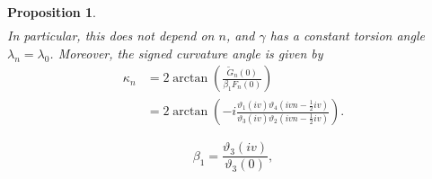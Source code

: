 \documentclass[10pt,a4paper]{amsart}
\newtheorem{prop}{Proposition}
\begin{document}
\begin{prop}
\begin{equation}
\begin{split}
\end{split}
\end{equation}
In particular, this does not depend on $n$,
and $\gamma$ has a constant torsion angle
$\lambda_n=\lambda_0$.
Moreover,
the signed curvature angle is given by
\begin{equation}\label{kappa1}
\begin{split}
\kappa_{n}&=2\arctan\left(\frac{\widetilde{G}_{n}(0)}{\beta_{1} F_{n}(0)}\right)\\
&=2\arctan\left(-i\frac{\vartheta_1(iv)\vartheta_4\left(ivn-\frac{1}{2}iv\right)}{\vartheta_3(iv)\vartheta_2\left(ivn-\frac{1}{2}iv\right)}\right).
\end{split}
\end{equation}
\end{prop}

\begin{equation}
\beta_{1}=\frac{\vartheta_3(iv)}{\vartheta_3(0)},
\end{equation}
\end{document}
